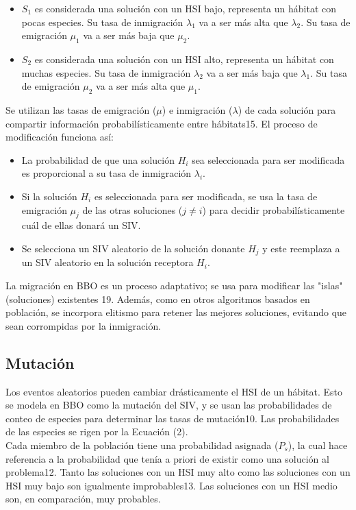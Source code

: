 \documentclass{article}
\begin{document}
\begin{itemize}
    \item $S_1$ es considerada una solución con un HSI bajo, representa un hábitat con pocas especies. Su tasa de inmigración $\lambda_1$ va a ser más alta que $\lambda_2$. Su tasa de emigración $\mu_1$ va a ser más baja que $\mu_2$.
    \item $S_2$ es considerada una solución con un HSI alto, representa un hábitat con muchas especies. Su tasa de inmigración $\lambda_2$ va a ser más baja que $\lambda_1$. Su tasa de emigración $\mu_2$ va a ser más alta que $\mu_1$.
\end{itemize}
Se utilizan las tasas de emigración ($\mu$) e inmigración ($\lambda$) de cada solución para compartir información probabilísticamente entre hábitats15. El proceso de modificación funciona así:
\begin{itemize}
    \item La probabilidad de que una solución $H_i$ sea seleccionada para ser modificada es proporcional a su tasa de inmigración $\lambda_i$.
    \item Si la solución $H_i$ es seleccionada para ser modificada, se usa la tasa de emigración $\mu_j$ de las otras soluciones ($j \neq i$) para decidir probabilísticamente cuál de ellas donará un SIV.
    \item Se selecciona un SIV aleatorio de la solución donante $H_j$ y este reemplaza a un SIV aleatorio en la solución receptora $H_i$.
\end{itemize}
La migración en BBO es un proceso adaptativo; se usa para modificar las "islas" (soluciones) existentes 19. Además, como en otros algoritmos basados en población, se incorpora elitismo para retener las mejores soluciones, evitando que sean corrompidas por la inmigración.


\subsection{Mutación} \label{sec:mutation}Los eventos aleatorios pueden cambiar drásticamente el HSI de un hábitat. Esto se modela en BBO como la mutación del SIV, y se usan las probabilidades de conteo de especies para determinar las tasas de mutación10. Las probabilidades de las especies se rigen por la Ecuación (2).\\

Cada miembro de la población tiene una probabilidad asignada ($P_s$), la cual hace referencia a la probabilidad que tenía a priori de existir como una solución al problema12. Tanto las soluciones con un HSI muy alto como las soluciones con un HSI muy bajo son igualmente improbables13. Las soluciones con un HSI medio son, en comparación, muy probables.\\
\end{document}
